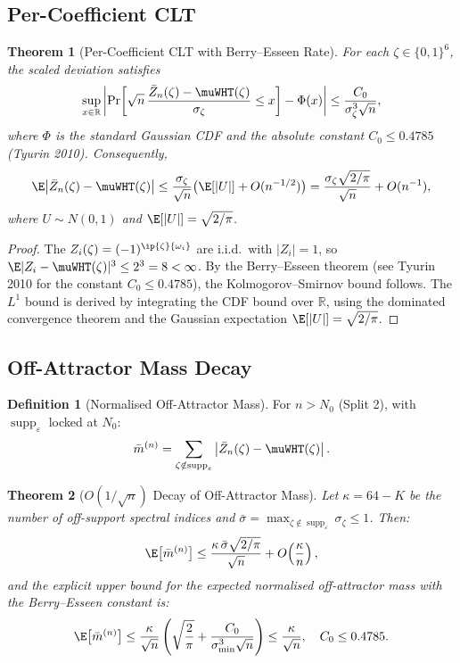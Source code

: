 \documentclass[12pt,letterpaper]{article}
\theoremstyle{definition}
\newtheorem{definition}{Definition}[section]
\theoremstyle{plain}
\newtheorem{theorem}{Theorem}[section]
\theoremstyle{remark}
\newcommand{\supp}{\operatorname{supp}}
\newcommand{\mbar}{\bar{m}}
\begin{document}
\subsection{Per-Coefficient CLT}

\begin{theorem}[Per-Coefficient CLT with Berry--Esseen Rate]
\label{thm:be}
For each $\zeta \in \{0,1\}^6$, the scaled deviation satisfies
\[
  \sup_{x\in\mathbb{R}}\left|
    \Pr\!\left[\sqrt{n}\,\frac{\bar{Z}_n(\zeta)-\muWHT(\zeta)}{\sigma_\zeta}
         \le x\right] - \Phi(x)
  \right|
  \le \frac{C_0}{\sigma_\zeta^3\sqrt{n}},
\]
where $\Phi$ is the standard Gaussian CDF and the absolute constant
$C_0 \le 0.4785$ (Tyurin 2010).  Consequently,
\[
  \E\!\left|\bar{Z}_n(\zeta) - \muWHT(\zeta)\right|
  \le \frac{\sigma_\zeta}{\sqrt{n}}\bigl(\E[|U|] + O(n^{-1/2})\bigr)
  = \frac{\sigma_\zeta\sqrt{2/\pi}}{\sqrt{n}} + O(n^{-1}),
\]
where $U\sim N(0,1)$ and $\E[|U|]=\sqrt{2/\pi}$.
\end{theorem}

\begin{proof}
The $Z_i(\zeta) = (-1)^{\ip{\zeta}{\omega_i}}$ are i.i.d.\ with
$|Z_i| = 1$, so $\E|Z_i - \muWHT(\zeta)|^3 \le 2^3 = 8 < \infty$.
By the Berry--Esseen theorem (see Tyurin 2010 for the constant $C_0 \le 0.4785$),
the Kolmogorov--Smirnov bound follows.  The $L^1$ bound is derived by
integrating the CDF bound over $\mathbb{R}$, using the dominated convergence
theorem and the Gaussian expectation $\E[|U|] = \sqrt{2/\pi}$.
\end{proof}

\subsection{Off-Attractor Mass Decay}

\begin{definition}[Normalised Off-Attractor Mass]
For $n > N_0$ (Split 2), with $\supp_\varepsilon$ locked at $N_0$:
\[
  \mbar^{(n)}
    = \sum_{\zeta \notin \supp_\varepsilon}
        \left|\bar{Z}_n(\zeta) - \muWHT(\zeta)\right|.
\]
\end{definition}

\begin{theorem}[$O(1/\sqrt{n})$ Decay of Off-Attractor Mass]
\label{thm:decay}
Let $\kappa = 64 - K$ be the number of off-support spectral indices and
$\bar{\sigma} = \max_{\zeta \notin \supp_\varepsilon} \sigma_\zeta \le 1$.
Then:
\[
  \E\bigl[\mbar^{(n)}\bigr]
  \le \frac{\kappa\,\bar{\sigma}\sqrt{2/\pi}}{\sqrt{n}}
    + O\!\left(\frac{\kappa}{n}\right),
\]
and the explicit upper bound for the expected normalised off-attractor mass
with the Berry--Esseen constant is:
\[
  \E\bigl[\mbar^{(n)}\bigr]
  \le \frac{\kappa}{\sqrt{n}}
  \left(\sqrt{\frac{2}{\pi}} + \frac{C_0}{\sigma_{\min}^3\sqrt{n}}\right)
  \le \frac{\kappa}{\sqrt{n}},
  \quad C_0 \le 0.4785.
\]
\end{theorem}
\end{document}
